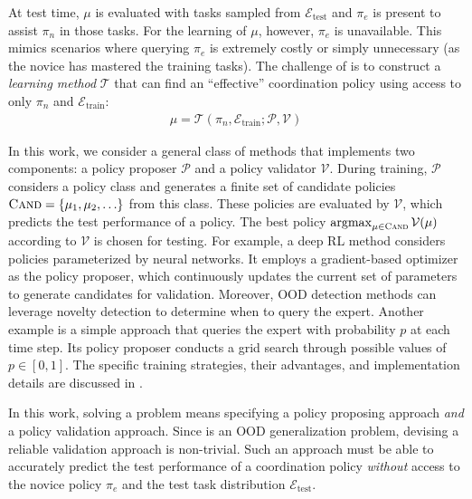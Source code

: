 At test time, $\mu$ is evaluated with tasks sampled from $\mathcal{E}_{\text{test}}$ and $\pi_e$ is present to assist $\pi_n$ in those tasks. 
For the learning of $\mu$, however, $\pi_e$ is unavailable.
This mimics scenarios where querying $\pi_e$ is extremely costly or simply unnecessary (as the novice has mastered the training tasks).
The challenge of \ourMethod is to construct a \textit{learning method} $\mathcal{T}$ that can find an ``effective'' coordination policy using access to only $\pi_n$ and $\mathcal{E}_{\textrm{train}}$:
\begin{align}
    \mu = \mathcal{T}(\pi_n, \mathcal{E}_{\text{train}}; \mathcal{P}, \mathcal{V})
\end{align}

In this work, we consider a general class of methods that implements two components: a policy proposer $\mathcal{P}$ and a policy validator $\mathcal{V}$.
During training, $\mathcal{P}$ considers a policy class and generates a finite set of candidate policies $\textsc{Cand} = \{ \mu_1, \mu_2, \ldots \}$ from this class. 
These policies are evaluated by $\mathcal{V}$, which predicts the test performance of a policy.
The best policy $\operatorname*{argmax}_{\mu \in \textsc{Cand}} \mathcal{V}(\mu)$ according to $\mathcal{V}$ is chosen for testing. 
For example, a deep RL method considers policies parameterized by neural networks. 
It employs a gradient-based optimizer as the policy proposer, which continuously updates the current set of parameters to generate candidates for validation. Moreover, OOD detection methods can leverage novelty detection to determine when to query the expert.
Another example is a simple approach that queries the expert with probability $p$ at each time step.
Its policy proposer conducts a grid search through possible values of $p \in [0, 1]$.
The specific training strategies, their advantages, and implementation details are discussed in .


In this work, solving a \ourMethod problem means specifying a policy proposing approach \textit{and} a policy validation approach.
Since \ourMethod is an OOD generalization problem, devising a reliable validation approach is non-trivial.
Such an approach must be able to accurately predict the test performance of a coordination policy \textit{without} access to the novice policy $\pi_e$ and the test task distribution $\mathcal{E}_{\textrm{test}}$.



